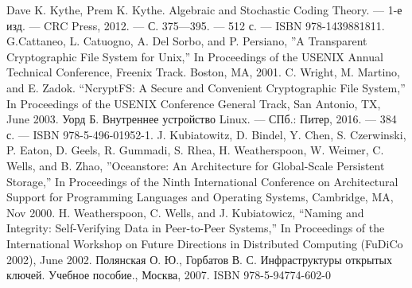 \begin{thebibliography}{}
    Dave K. Kythe, Prem K. Kythe. Algebraic and Stochastic Coding Theory. — 1-е изд. — CRC Press, 2012. — С. 375—395. — 512 с. — ISBN 978-1439881811.
    G.Cattaneo, L. Catuogno, A. Del Sorbo, and P. Persiano, ''A Transparent Cryptographic File System for Unix,'' In Proceedings of the USENIX Annual Technical Conference, Freenix Track. Boston, MA, 2001.
    C. Wright, M. Martino, and E. Zadok. “NcryptFS: A Secure and Convenient Cryptographic File System,” In Proceedings of the USENIX Conference General Track, San Antonio, TX, June 2003.
    Уорд Б. Внутреннее устройство Linux. — СПб.: Питер, 2016. — 384 с. — ISBN 978-5-496-01952-1.
    J. Kubiatowitz, D. Bindel, Y. Chen, S. Czerwinski, P. Eaton, D. Geels, R. Gummadi, S. Rhea, H. Weatherspoon, W. Weimer, C. Wells, and B. Zhao, ''Oceanstore: An Architecture for Global-Scale Persistent Storage,'' In Proceedings of the Ninth International Conference on Architectural Support for Programming Languages and Operating Systems, Cambridge, MA, Nov 2000.
    H. Weatherspoon, C. Wells, and J. Kubiatowicz, “Naming and Integrity: Self-Verifying Data in Peer-to-Peer Systems,” In Proceedings of the International Workshop on Future Directions in Distributed Computing (FuDiCo 2002), June 2002.
	Полянская О. Ю., Горбатов В. С. Инфраструктуры открытых ключей. Учебное пособие., Москва, 2007. ISBN 978-5-94774-602-0
\end{thebibliography}
\endgroup

\pagebreak